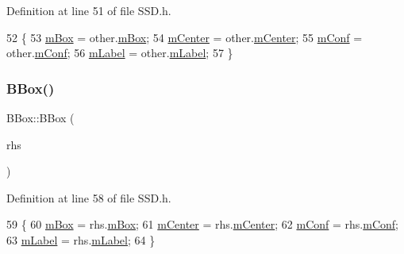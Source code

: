 Definition at line 51 of file S\+S\+D.\+h.


\begin{DoxyCode}
52     \{
53         \mbox{\hyperlink{class_b_box_ac9143a10a051ff8ce0ae26e6c1e4b4e1}{mBox}} = other.\mbox{\hyperlink{class_b_box_ac9143a10a051ff8ce0ae26e6c1e4b4e1}{mBox}};
54         \mbox{\hyperlink{class_b_box_a4367a9314599320633ef19abfae3a83c}{mCenter}} = other.\mbox{\hyperlink{class_b_box_a4367a9314599320633ef19abfae3a83c}{mCenter}};
55         \mbox{\hyperlink{class_b_box_ac2b9483e6f0372284e06724d7ae953ff}{mConf}} = other.\mbox{\hyperlink{class_b_box_ac2b9483e6f0372284e06724d7ae953ff}{mConf}};
56         \mbox{\hyperlink{class_b_box_a779985e94cd7b9b3c62208493de419be}{mLabel}} = other.\mbox{\hyperlink{class_b_box_a779985e94cd7b9b3c62208493de419be}{mLabel}};
57     \}
\end{DoxyCode}
\mbox{\label{class_b_box_a0b083839aa620260f77f87bfc307a74a}} 
\subsubsection{\texorpdfstring{B\+Box()}{BBox()}\hspace{0.1cm}{\footnotesize\ttfamily [4/4]}}
{\footnotesize\ttfamily B\+Box\+::\+B\+Box (\begin{DoxyParamCaption}\item[{const \mbox{\hyperlink{class_b_box}{B\+Box}} \&\&}]{rhs }\end{DoxyParamCaption})\hspace{0.3cm}{\ttfamily [inline]}}



Definition at line 58 of file S\+S\+D.\+h.


\begin{DoxyCode}
59     \{
60         \mbox{\hyperlink{class_b_box_ac9143a10a051ff8ce0ae26e6c1e4b4e1}{mBox}} = rhs.\mbox{\hyperlink{class_b_box_ac9143a10a051ff8ce0ae26e6c1e4b4e1}{mBox}};
61         \mbox{\hyperlink{class_b_box_a4367a9314599320633ef19abfae3a83c}{mCenter}} = rhs.\mbox{\hyperlink{class_b_box_a4367a9314599320633ef19abfae3a83c}{mCenter}};
62         \mbox{\hyperlink{class_b_box_ac2b9483e6f0372284e06724d7ae953ff}{mConf}} = rhs.\mbox{\hyperlink{class_b_box_ac2b9483e6f0372284e06724d7ae953ff}{mConf}};
63         \mbox{\hyperlink{class_b_box_a779985e94cd7b9b3c62208493de419be}{mLabel}} = rhs.\mbox{\hyperlink{class_b_box_a779985e94cd7b9b3c62208493de419be}{mLabel}};
64     \}
\end{DoxyCode}


